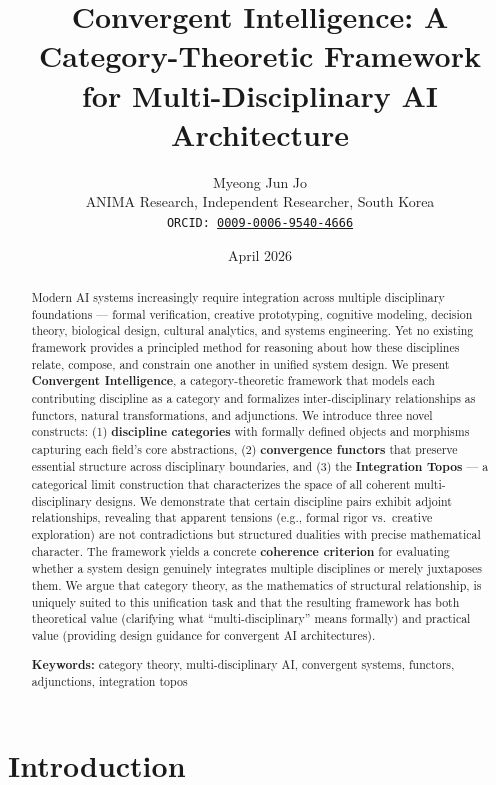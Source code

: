 \documentclass[11pt,a4paper]{article}
\title{\textbf{Convergent Intelligence: A Category-Theoretic Framework\\for Multi-Disciplinary AI Architecture}}
\author{Myeong Jun Jo\\
ANIMA Research, Independent Researcher, South Korea\\
\texttt{ORCID: \href{https://orcid.org/0009-0006-9540-4666}{0009-0006-9540-4666}}}
\date{April 2026}
\begin{document}
\maketitle

\begin{abstract}
Modern AI systems increasingly require integration across multiple disciplinary foundations --- formal verification, creative prototyping, cognitive modeling, decision theory, biological design, cultural analytics, and systems engineering. Yet no existing framework provides a principled method for reasoning about how these disciplines relate, compose, and constrain one another in unified system design. We present \textbf{Convergent Intelligence}, a category-theoretic framework that models each contributing discipline as a category and formalizes inter-disciplinary relationships as functors, natural transformations, and adjunctions. We introduce three novel constructs: (1) \textbf{discipline categories} with formally defined objects and morphisms capturing each field's core abstractions, (2) \textbf{convergence functors} that preserve essential structure across disciplinary boundaries, and (3) the \textbf{Integration Topos} --- a categorical limit construction that characterizes the space of all coherent multi-disciplinary designs. We demonstrate that certain discipline pairs exhibit adjoint relationships, revealing that apparent tensions (e.g., formal rigor vs.\ creative exploration) are not contradictions but structured dualities with precise mathematical character. The framework yields a concrete \textbf{coherence criterion} for evaluating whether a system design genuinely integrates multiple disciplines or merely juxtaposes them. We argue that category theory, as the mathematics of structural relationship, is uniquely suited to this unification task and that the resulting framework has both theoretical value (clarifying what ``multi-disciplinary'' means formally) and practical value (providing design guidance for convergent AI architectures).

\medskip
\noindent\textbf{Keywords:} category theory, multi-disciplinary AI, convergent systems, functors, adjunctions, integration topos
\end{abstract}

\section{Introduction}
\end{document}

